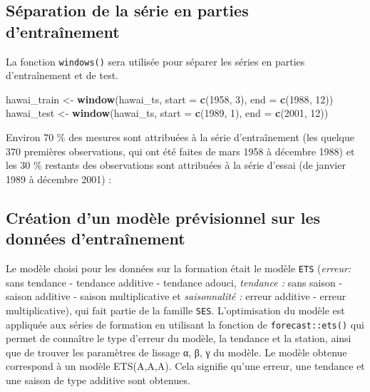 \documentclass[
]{article}
\newenvironment{Shaded}{\begin{snugshade}}{\end{snugshade}}
\newcommand{\DataTypeTok}[1]{\textcolor[rgb]{0.13,0.29,0.53}{#1}}
\newcommand{\DecValTok}[1]{\textcolor[rgb]{0.00,0.00,0.81}{#1}}
\newcommand{\KeywordTok}[1]{\textcolor[rgb]{0.13,0.29,0.53}{\textbf{#1}}}
\newcommand{\NormalTok}[1]{#1}
\newcommand{\StringTok}[1]{\textcolor[rgb]{0.31,0.60,0.02}{#1}}
\begin{document}
\hypertarget{suxe9paration-de-la-suxe9rie-en-parties-dentrauxeenement}{%
\subsection{Séparation de la série en parties
d'entraînement}\label{suxe9paration-de-la-suxe9rie-en-parties-dentrauxeenement}}

La fonction \texttt{windows()} sera utilisée pour séparer les séries en
parties d'entraînement et de test.

\begin{Shaded}
\begin{Highlighting}[]
\NormalTok{hawai_train <-}\StringTok{ }\KeywordTok{window}\NormalTok{(hawai_ts, }\DataTypeTok{start =} \KeywordTok{c}\NormalTok{(}\DecValTok{1958}\NormalTok{, }\DecValTok{3}\NormalTok{), }\DataTypeTok{end =} \KeywordTok{c}\NormalTok{(}\DecValTok{1988}\NormalTok{, }\DecValTok{12}\NormalTok{))}
\NormalTok{hawai_test <-}\StringTok{ }\KeywordTok{window}\NormalTok{(hawai_ts, }\DataTypeTok{start =} \KeywordTok{c}\NormalTok{(}\DecValTok{1989}\NormalTok{, }\DecValTok{1}\NormalTok{), }\DataTypeTok{end =} \KeywordTok{c}\NormalTok{(}\DecValTok{2001}\NormalTok{, }\DecValTok{12}\NormalTok{))}
\end{Highlighting}
\end{Shaded}

Environ 70 \% des mesures sont attribuées à la série d'entraînement (les
quelque 370 premières observations, qui ont été faites de mars 1958 à
décembre 1988) et les 30 \% restants des observations sont attribuées à
la série d'essai (de janvier 1989 à décembre 2001) :

\hypertarget{cruxe9ation-dun-moduxe8le-pruxe9visionnel-sur-les-donnuxe9es-dentrauxeenement}{%
\subsection{Création d'un modèle prévisionnel sur les données
d'entraînement}\label{cruxe9ation-dun-moduxe8le-pruxe9visionnel-sur-les-donnuxe9es-dentrauxeenement}}

Le modèle choisi pour les données sur la formation était le modèle
\texttt{ETS} (\emph{erreur:} sans tendance - tendance additive -
tendance adouci, \emph{tendance :} sans saison - saison additive -
saison multiplicative et \emph{saisonnalité :} erreur additive - erreur
multiplicative), qui fait partie de la famille \texttt{SES}.
L'optimisation du modèle est appliquée aux séries de formation en
utilisant la fonction de \texttt{forecast::ets()} qui permet de
connaître le type d'erreur du modèle, la tendance et la station, ainsi
que de trouver les paramètres de lissage α, β, γ du modèle. Le modèle
obtenue correspond à un modèle ETS(A,A,A). Cela signifie qu'une erreur,
une tendance et une saison de type additive sont obtenues.
\end{document}

